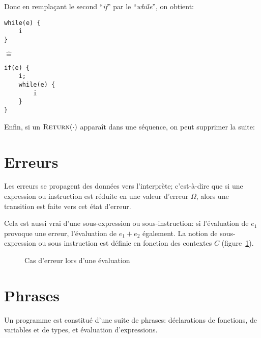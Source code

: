Donc en remplaçant le second ``\emph{if}'' par le ``\emph{while}'', on obtient:

\begin{minipage}{0.3\textwidth}
\begin{Verbatim}
while(e) {
    i
}
\end{Verbatim}
\end{minipage}
$\widehat{=}$\hspace{1cm}
\begin{minipage}{0.3\textwidth}
\begin{Verbatim}
if(e) {
    i;
    while(e) {
        i
    }
}
\end{Verbatim}
\end{minipage}

Enfin, si un $\phx\iReturn$ apparaît dans une séquence, on peut supprimer la suite:

\begin{mathpar}
\end{mathpar}

\section{Erreurs}
\label{sec:eval-errors}

Les erreurs se propagent des données vers l'interprète; c'est-à-dire que si
une expression ou instruction est réduite en une valeur d'erreur $Ω$, alors une
transition est faite vers cet état d'erreur.

Cela est aussi vrai d'une sous-expression ou sous-instruction: si l'évaluation
de $e_1$ provoque une erreur, l'évaluation de $e_1 + e_2$ également. La notion
de sous-expression ou sous instruction est définie en fonction des contextes $C$
(figure~\ref{fig:eval-err}).

\begin{figure}
\begin{mathpar}


\end{mathpar}

\caption{Cas d'erreur lors d'une évaluation}
\label{fig:eval-err}
\end{figure}

\section{Phrases}

Un programme est constitué d'une suite de phrases: déclarations de fonctions,
de variables et de types, et évaluation d'expressions.


